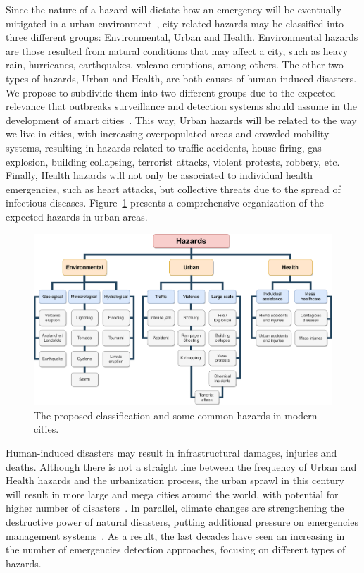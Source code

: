 \begin{refsection}
Since the nature of a hazard will dictate how an emergency will be eventually mitigated in a urban environment~\cite{citiesdisasters1,hazard2,hazard4}, city-related hazards may be classified into three different groups: Environmental, Urban and Health. Environmental hazards are those resulted from natural conditions that may affect a city, such as heavy rain, hurricanes, earthquakes, volcano eruptions, among others. The other two types of hazards, Urban and Health, are both causes of human-induced disasters. We propose to subdivide them into two different groups due to the expected relevance that outbreaks surveillance and detection systems should assume in the development of smart cities~\cite{covidsmartcities1,covidsmartcities2,enviroment3}. This way, Urban hazards will be related to the way we live in cities, with increasing overpopulated areas and crowded mobility systems, resulting in hazards related to traffic accidents, house firing, gas explosion, building collapsing, terrorist attacks, violent protests, robbery, etc. Finally, Health hazards will not only be associated to individual health emergencies, such as heart attacks, but collective threats due to the spread of infectious diseases. Figure~\ref{Fig:hazards} presents a comprehensive organization of the expected hazards in urban areas. 

\begin{figure}[htbp]
  \centering
  \includegraphics[width=\linewidth]{Chapters/1-Survey/images/Hazards.pdf}
  \caption{The proposed classification and some common hazards in modern cities.}\label{Fig:hazards}
\end{figure}

Human-induced disasters may result in infrastructural damages, injuries and deaths. Although there is not a straight line between the frequency of Urban and Health hazards and the urbanization process, the urban sprawl in this century will result in more large and mega cities around the world, with potential for higher number of disasters~\cite{urbansprawl1,urbansprawl2}. In parallel, climate changes are strengthening the destructive power of natural disasters, putting additional pressure on emergencies management systems~\cite{enviroment1,enviroment2}. As a result, the last decades have seen an increasing in the number of emergencies detection approaches, focusing on different types of hazards. 


\end{refsection}
